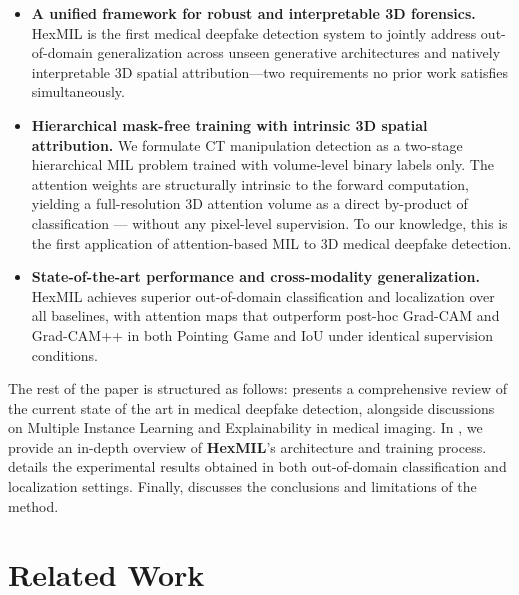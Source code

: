 \documentclass[sigconf, screen, review, anonymous]{acmart}
\begin{document}
\begin{itemize}

    \item \textbf{A unified framework for robust and interpretable 3D forensics.}
    HexMIL is the first medical deepfake detection system to jointly address out-of-domain generalization across unseen generative architectures and natively interpretable 3D spatial attribution---two requirements no prior work satisfies simultaneously.

    \item \textbf{Hierarchical mask-free training with intrinsic 3D spatial attribution.}
    We formulate CT manipulation detection as a two-stage hierarchical MIL problem trained with volume-level binary labels only. The attention weights are structurally intrinsic to the forward computation, yielding a full-resolution 3D attention volume as a direct by-product of classification --- without any pixel-level supervision. To our knowledge, this is the first application of attention-based MIL to 3D medical deepfake detection.

    \item \textbf{State-of-the-art performance and cross-modality generalization.}
    HexMIL achieves superior out-of-domain classification and localization over all baselines, with attention maps that outperform post-hoc Grad-CAM and Grad-CAM++ in both Pointing Game and IoU under identical supervision conditions.

\end{itemize}

The rest of the paper is structured as follows:  presents a comprehensive review of the current state of the art in medical deepfake detection, alongside discussions on Multiple Instance Learning and Explainability in medical imaging. In , we provide an in-depth overview of \textbf{HexMIL}'s architecture and training process.  details the experimental results obtained in both out-of-domain classification and localization settings. Finally,  discusses the conclusions and limitations of the method.

\section{Related Work}
\label{sec:related}
\end{document}
